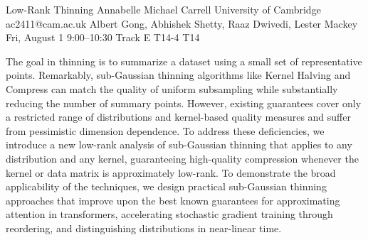 \begin{talk}
  {Low-Rank Thinning}%
  {Annabelle Michael Carrell}%
  {University of Cambridge}%
  {ac2411@cam.ac.uk}%
  {Albert Gong, Abhishek Shetty, Raaz Dwivedi, Lester Mackey}%
  {}%
  {Fri, August 1 9:00–10:30 Track E}%
  {T14-4}%
  {T14}%
			
The goal in thinning is to summarize a dataset using a small set of representative points. Remarkably, sub-Gaussian thinning algorithms like Kernel Halving and Compress can match the quality of uniform subsampling while substantially reducing the number of summary points. However, existing guarantees cover only a restricted range of distributions and kernel-based quality measures and suffer from pessimistic dimension dependence. To address these deficiencies, we introduce a new low-rank analysis of sub-Gaussian thinning that applies to any distribution and any kernel, guaranteeing high-quality compression whenever the kernel or data matrix is approximately low-rank. To demonstrate the broad applicability of the techniques, we design practical sub-Gaussian thinning approaches that improve upon the best known guarantees for approximating attention in transformers, accelerating stochastic gradient training through reordering, and distinguishing distributions in near-linear time. 

\medskip

\end{talk}
